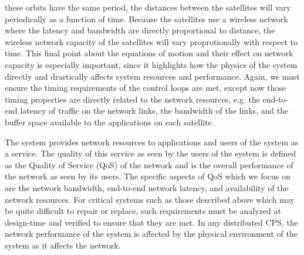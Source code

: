 these orbits have the same period, the distances between the
satellites will vary periodically as a function of time.  Because the
satellites use a wireless network where the latency and bandwidth are
directly proportional to distance, the wireless network capacity of
the satellites will vary proprotionally with respect to time.  This
final point about the equations of motion and their effect on network
capacity is especially important, since it highlights how the physics
of the system directly and drastically affects system resources and
performance.  Again, we must ensure the timing requirements of the
control loops are met, except now those timing properties are directly
related to the network resources, e.g. the end-to-end latency of
traffic on the network links, the bandwidth of the links, and the
buffer space available to the applications on each satellite.

The system provides network resources to applications and users of the
system as a service.  The quality of this service as seen by the users
of the system is defined as the Quality of Service (QoS) of the
network and is the overall performance of the network as seen by its
users.  The specific aspects of QoS which we focus on are the network
bandwidth, end-to-end network latency, and availability of the network
resources.  For critical systems such as those described above which
may be quite difficult to repair or replace, such requirements must be
analyzed at design-time and verified to ensure that they are met.  In
any distributed CPS, the network performance of the system is affected
by the physical environment of the system as it affects the network.

